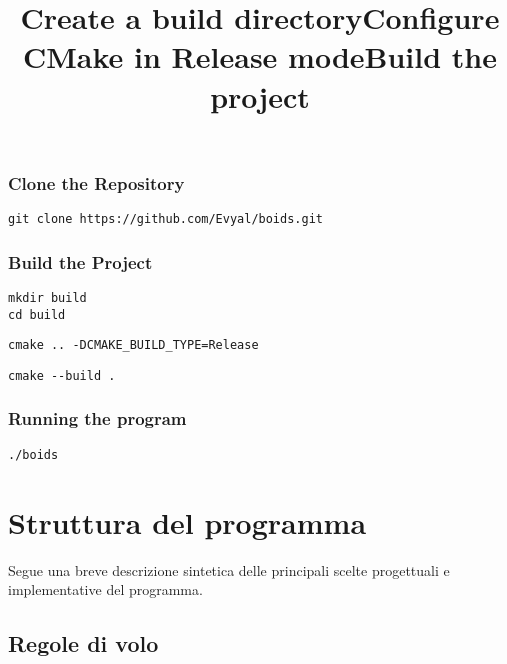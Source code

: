 \documentclass[10pt,a4paper]{article}
\begin{document}

\subsubsection{Clone the Repository}

\begin{lstlisting}
git clone https://github.com/Evyal/boids.git
\end{lstlisting}

\subsubsection{Build the Project}

    
\title{\textbf{Create a build directory}}

\begin{lstlisting}
mkdir build
cd build
\end{lstlisting}

\title{\textbf{Configure CMake in Release mode}}

\begin{lstlisting}
cmake .. -DCMAKE_BUILD_TYPE=Release
\end{lstlisting}

\title{\textbf{Build the project}} 

\begin{lstlisting}
cmake --build .
\end{lstlisting}

\subsubsection{Running the program} 

\begin{lstlisting}
./boids
\end{lstlisting}

\newpage

\section{Struttura del programma}
Segue una breve descrizione sintetica delle principali scelte progettuali e implementative del programma.

\subsection{Regole di volo}
\end{document}
